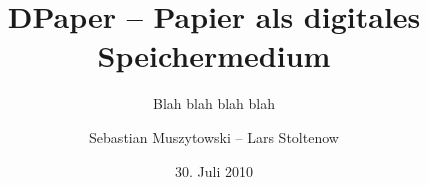 \documentclass{beamer}
\title[DPaper]{DPaper -- Papier als digitales Speichermedium}
\subtitle{Blah blah blah blah}
\author{Sebastian Muszytowski -- Lars Stoltenow}
\institute{Chaosdorf}
\date{30. Juli 2010}
\begin{document}
\begin{frame}
\titlepage
\end{frame}



\end{document}

